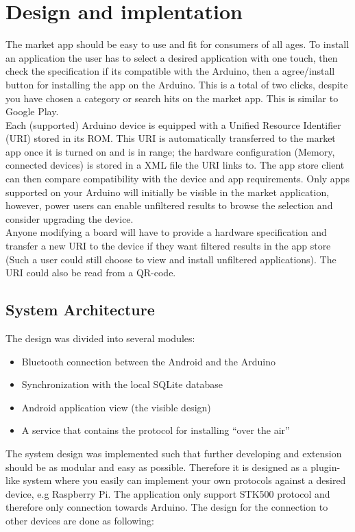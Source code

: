 \chapter{Design and implentation}
The market app should be easy to use and fit for consumers of all ages. To install an application the user has to select a desired application with one touch, then check the specification if its compatible with the Arduino, then a agree/install button for installing the app on the Arduino. This is a total of two clicks, despite you have chosen a category or search hits on the market app. This is similar to Google Play.\\
\newline
Each (supported) Arduino device is equipped with a Unified Resource Identifier (URI) stored in its ROM. This URI is automatically transferred to the market app once it is turned on and is in range; the hardware configuration (Memory, connected devices) is stored in a XML file the URI links to.
The app store client can then compare compatibility with the device and app requirements.
Only apps supported on your Arduino will initially be visible in the market application, however, power users can enable unfiltered results to browse the selection and consider upgrading the device.\\
\newline
Anyone modifying a board will have to provide a hardware specification and transfer a new URI to the device if they want filtered results in the app store (Such a user could still choose to view and install unfiltered applications).
The URI could also be read from a QR-code.

\section{System Architecture}
	The design was divided into several modules:
	\begin{itemize}
		\item{Bluetooth connection between the Android and the Arduino}
		\item{Synchronization with the local SQLite database}
		\item{Android application view (the visible design)}
		\item{A service that contains the protocol for installing ``over the air''}
	\end{itemize}
	\vspace{0.2in}
	
	The system design was implemented such that further developing and extension should be as modular and easy as possible.
	Therefore it is designed as a plugin-like system where you easily can implement your own protocols against a desired device, e.g Raspberry Pi. The application only support STK500 protocol and therefore only connection towards Arduino.
	The design for the connection to other devices are done as following:\\

